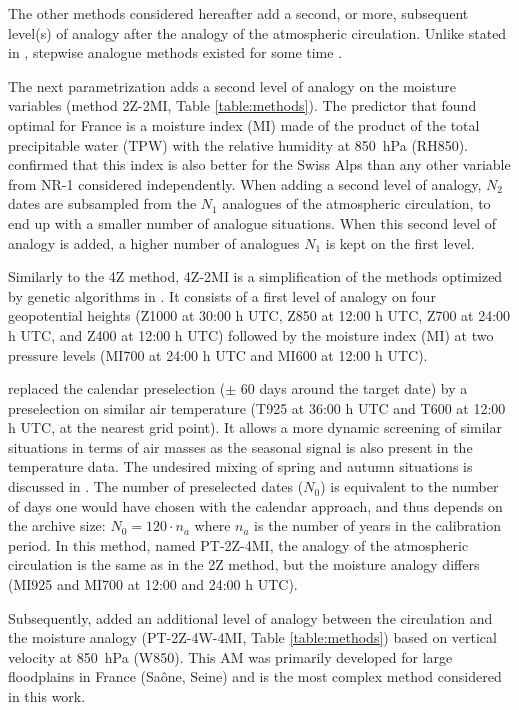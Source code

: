 \documentclass{ametsoc}
\begin{document}
The other methods considered hereafter add a second, or more, subsequent level(s) of analogy after the analogy of the atmospheric circulation. Unlike stated in \citet{Caillouet2016}, stepwise analogue methods existed for some time \citep[e.g.][]{Bontron2004, Bontron2005, Marty2010, Marty2012, Horton2012a}. 

The next parametrization adds a second level of analogy on the moisture variables (method 2Z-2MI, Table \ref{table:methods}). The predictor that \citet{Bontron2004} found optimal for France is a moisture index (MI) made of the product of the total precipitable water (TPW) with the relative humidity at 850~hPa (RH850). \cite{Horton2012a} confirmed that this index is also better for the Swiss Alps than any other variable from NR-1 considered independently. When adding a second level of analogy, $N_{2}$ dates are subsampled from the $N_{1}$ analogues of the atmospheric circulation, to end up with a smaller number of analogue situations. When this second level of analogy is added, a higher number of analogues $N_{1}$ is kept on the first level. 

Similarly to the 4Z method, 4Z-2MI is a simplification of the methods optimized by genetic algorithms in \citet{Horton2017b}. It consists of a first level of analogy on four geopotential heights (Z1000 at 30:00 h UTC, Z850 at 12:00 h UTC, Z700 at 24:00 h UTC, and Z400 at 12:00 h UTC) followed by the moisture index (MI) at two pressure levels (MI700 at 24:00 h UTC and MI600 at 12:00 h UTC).

\citet{BenDaoud2016} replaced the calendar preselection ($\pm$ 60 days around the target date) by a preselection on similar air temperature (T925 at 36:00 h UTC and T600 at 12:00 h UTC, at the nearest grid point). It allows a more dynamic screening of similar situations in terms of air masses as the seasonal signal is also present in the temperature data. The undesired mixing of spring and autumn situations is discussed in \citet{Caillouet2016}. The number of preselected dates ($N_{0}$) is equivalent to the number of days one would have chosen with the calendar approach, and thus depends on the archive size: $N_{0} = 120 \cdot n_{a}$ where $n_{a}$ is the number of years in the calibration period. In this method, named PT-2Z-4MI, the analogy of the atmospheric circulation is the same as in the 2Z method, but the moisture analogy differs (MI925 and MI700 at 12:00 and 24:00 h UTC).

Subsequently, \citet{BenDaoud2016} added an additional level of analogy between the circulation and the moisture analogy (PT-2Z-4W-4MI, Table \ref{table:methods}) based on vertical velocity at 850~hPa (W850). This AM was primarily developed for large floodplains in France (Sa\^{o}ne, Seine) and is the most complex method considered in this work. 
\end{document}
